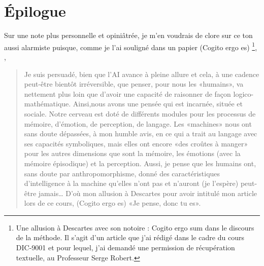 \section{Épilogue}

Sur une note plus personnelle et opiniâtrée, je m'en voudrais de clore sur ce ton aussi alarmiste puisque, comme je l'ai souligné dans un papier (Cogito ergo es) \footnote{Une allusion à Descartes avec son notoire : Cogito ergo sum dans le discours de la méthode. Il s'agit d'un article que j'ai rédigé dans le cadre du cours DIC-9001 et pour lequel, j'ai demandé une permission de récupération textuelle, au Professeur Serge Robert.}, \citep{Loyer1971Cogito},
    \begin{quote}
        Je suis persuadé, bien que l'AI avance à pleine allure et cela, à une cadence peut-être bientôt irréversible, que penser, pour nous les «humains», va nettement plus loin que d'avoir une capacité de raisonner de façon logico-mathématique. Ainsi,nous avons une pensée qui est incarnée, située et sociale. Notre cerveau est doté de différents modules pour les processus de mémoire, d'émotion, de perception, de langage. Les «machines» nous ont sans doute dépassées, à mon humble avis, en ce qui a trait au langage avec ses capacités symboliques, mais elles ont encore «des croûtes à manger» pour les autres dimensions que sont la mémoire, les émotions (avec la mémoire épisodique) et la perception. Aussi, je pense que les humains ont, sans doute par anthropomorphisme, donné des caractéristiques d'intelligence à la machine qu'elles n'ont pas et n'auront (je l'espère) peut-être jamais… D'où mon allusion à Descartes \citep{Descartes2020Discours} pour avoir intitulé mon article lors de ce cours, (Cogito ergo es) «Je pense, donc tu es».
    \end{quote}

